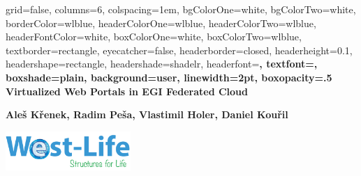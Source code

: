\documentclass[portrait,final,a0paper,fontscale=0.27]{baposter}
\begin{document}
\begin{poster}  %
  {
  grid=false,
  columns=6,
  colspacing=1em,
  bgColorOne=white,
  bgColorTwo=white,
  borderColor=wlblue,
  headerColorOne=wlblue,
  headerColorTwo=wlblue,
  headerFontColor=white,
  boxColorOne=white,
  boxColorTwo=wlblue,
  textborder=rectangle,
  eyecatcher=false,
  headerborder=closed,
  headerheight=0.1\textheight,
  headershape=rectangle,
  headershade=shadelr,
  headerfont=\Large\bf\textsc, %
  textfont={\setlength{\parindent}{0em}},
  boxshade=plain,
  background=user,
  linewidth=2pt,
  boxopacity=.5
  }
  {
    } 
  {\bf\huge Virtualized Web Portals in EGI Federated Cloud}
  {\vspace{1em}\bf{Aleš Křenek, Radim Peša, Vlastimil Holer, Daniel Kouřil}

%
}
  {%
  \includegraphics[height=4em]{wl-logo}
  }
  

    \newcommand{\colouredcircle}{%
      \tikz{\useasboundingbox (-0.2em,-0.32em) rectangle(0.2em,0.32em); \draw[draw=black,fill=lightgreen,line width=0.03em] (0,0) circle(0.18em);}}


\end{poster}
\end{document}
